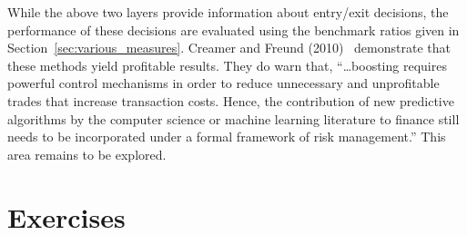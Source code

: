 While the above two layers provide information about entry/exit decisions, the performance of these decisions are evaluated using the benchmark ratios given in Section~\ref{sec:various_measures}. Creamer and Freund (2010)~\cite{creamer2010} demonstrate that these methods yield profitable results. They do warn that, ``\dots boosting requires powerful control mechanisms in order to reduce unnecessary and unprofitable trades that increase transaction costs. Hence, the contribution of new predictive algorithms by the computer science or machine learning literature to finance still needs to be incorporated under a formal framework of risk management.'' This area remains to be explored. \label{in:sta2}



\newpage



\section{Exercises}


